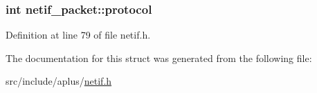 \hypertarget{structnetif__packet_a2517358f8125e0a674a0628a77f1095d}{
\subsubsection[{protocol}]{\setlength{\rightskip}{0pt plus 5cm}int netif\+\_\+packet\+::protocol}}\label{structnetif__packet_a2517358f8125e0a674a0628a77f1095d}


Definition at line 79 of file netif.\+h.



The documentation for this struct was generated from the following file\+:\begin{DoxyCompactItemize}
\item 
src/include/aplus/\hyperlink{netif_8h}{netif.\+h}\end{DoxyCompactItemize}
